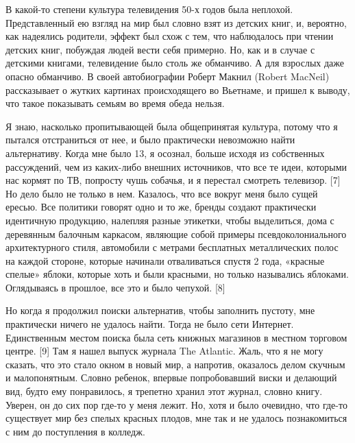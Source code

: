 \documentclass[ebook,12pt,oneside,openany]{memoir}
\begin{document}
В какой-то степени культура телевидения 50-х годов была неплохой.
Представленный ею взгляд на мир был словно взят из детских книг, и,
вероятно, как надеялись родители, эффект был схож с тем, что
наблюдалось при чтении детских книг, побуждая людей вести себя
примерно. Но, как и в случае с детскими книгами, телевидение было
столь же обманчиво. А для взрослых даже опасно обманчиво. В своей
автобиографии Роберт Макнил (Robert MacNeil) рассказывает о жутких
картинах происходящего во Вьетнаме, и пришел к выводу, что такое
показывать семьям во время обеда нельзя. \newline

Я знаю, насколько пропитывающей была общепринятая культура, потому что
я пытался отстраниться от нее, и было практически невозможно найти
альтернативу. Когда мне было 13, я осознал, больше исходя из
собственных рассуждений, чем из каких-либо внешних источников, что все
те идеи, которыми нас кормят по ТВ, попросту чушь собачья, и я
перестал смотреть телевизор. [7] Но дело было не только в нем.
Казалось, что все вокруг меня было сущей ересью. Все политики говорят
одно и то же, бренды создают практически идентичную продукцию,
налепляя разные этикетки, чтобы выделиться, дома с деревянным балочным
каркасом, являющие собой примеры псевдоколониального архитектурного
стиля, автомобили с метрами бесплатных металлических полос на каждой
стороне, которые начинали отваливаться спустя 2 года, «красные спелые»
яблоки, которые хоть и были красными, но только назывались яблоками.
Оглядываясь в прошлое, все это и было чепухой. [8] \newline

Но когда я продолжил поиски альтернатив, чтобы заполнить пустоту, мне
практически ничего не удалось найти. Тогда не было сети Интернет.
Единственным местом поиска была сеть книжных магазинов в местном
торговом центре. [9] Там я нашел выпуск журнала The Atlantic. Жаль,
что я не могу сказать, что это стало окном в новый мир, а напротив,
оказалось делом скучным и малопонятным. Словно ребенок, впервые
попробовавший виски и делающий вид, будто ему понравилось, я трепетно
хранил этот журнал, словно книгу. Уверен, он до сих пор где-то у меня
лежит. Но, хотя и было очевидно, что где-то существует мир без спелых
красных плодов, мне так и не удалось познакомиться с ним до
поступления в колледж. \newline
\end{document}
